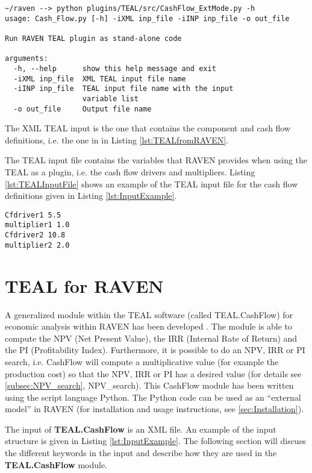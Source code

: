 \small
\begin{lstlisting}[caption=TEAL run as stand-alone python code, label=lst:TEALAsCode]
~/raven --> python plugins/TEAL/src/CashFlow_ExtMode.py -h
usage: Cash_Flow.py [-h] -iXML inp_file -iINP inp_file -o out_file

Run RAVEN TEAL plugin as stand-alone code

arguments:
  -h, --help      show this help message and exit
  -iXML inp_file  XML TEAL input file name
  -iINP inp_file  TEAL input file name with the input
                  variable list
  -o out_file     Output file name
\end{lstlisting}
\normalsize

The XML TEAL input is the one that contains the component and cash flow definitions, i.e. the one in  in Listing \ref{lst:TEALfromRAVEN}.

The TEAL input file contains the variables that RAVEN provides when using the TEAL as a plugin, i.e. the cash flow drivers and multipliers. Listing \ref{lst:TEALInputFile} shows an example of the TEAL input file for the cash flow definitions given in Listing \ref{lst:InputExample}.

\begin{lstlisting}[caption=TEAL run as stand-alone python code, label=lst:TEALInputFile]
Cfdriver1 5.5
multiplier1 1.0
Cfdriver2 10.8
multiplier2 2.0
\end{lstlisting}

\section{TEAL for RAVEN}
A generalized module within the TEAL software (called TEAL.CashFlow) for economic analysis within RAVEN has been developed \cite{MSApril2017}. The module is able to compute
the NPV (Net Present Value), the IRR (Internal Rate of Return) and the PI (Profitability Index). Furthermore, it is possible to
do an NPV, IRR or PI search, i.e. CashFlow will compute a multiplicative value (for example the production cost) so that the
NPV, IRR or PI has a desired value (for details see \ref{subsec:NPV_search}, NPV\_search). This CashFlow module has been written using the script language Python.
The Python code can be used as an ``external model'' in RAVEN (for installation and usage instructions, see \ref{sec:Installation}).

The input of \textbf{TEAL.CashFlow} is an XML file. An example of the input structure is given in Listing \ref{lst:InputExample}. The following section will discuss the
 different keywords in the input and describe how they are used in the \textbf{TEAL.CashFlow} module.

